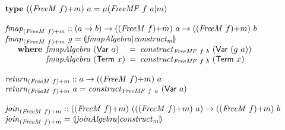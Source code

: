 \documentclass{jfp1}
\newcommand{\eFold}[2]{\llparenthesis #1|#2 \rrparenthesis}
\newcommand{\kw}[1]{\textbf{#1}}
\begin{document}
\begin{figure}
  \centering
  \begin{displaymath}
    \begin{array}{@{}l}
      \kw{type}~(\cprd{(\mathit{FreeM}~f)}{m})~a = \mu(\mathit{FreeMF}~f~a|m) \\
      \\
      \begin{array}{@{}l}
        \mathit{fmap}_{\cprd{(\mathit{FreeM}~f)}{m}} :: (a \to b) \to (\cprd{(\mathit{FreeM}~f)}{m})~a \to (\cprd{(\mathit{FreeM}~f)}{m})~b \\
        \mathit{fmap}_{\cprd{(\mathit{FreeM}~f)}{m}}~g = \eFold{\mathit{fmapAlgebra}}{\mathit{construct_m}} \\
        \quad\begin{array}{r@{\hspace{0.4em}}l@{\hspace{0.5em}}c@{\hspace{0.5em}}l}
          \kw{where} & \mathit{fmapAlgebra}~(\mathsf{Var}~a) &=& \mathit{construct}_{\mathit{FreeMF}~f~b}~(\mathsf{Var}~(g~a)) \\
          & \mathit{fmapAlgebra}~(\mathsf{Term}~x) &=& \mathit{construct}_{\mathit{FreeMF}~f~b}~(\mathsf{Term}~x)
        \end{array}
      \end{array} \\
      \\
      \begin{array}{@{}l}
        \mathit{return}_{\cprd{(\mathit{FreeM}~f)}{m}} :: a \to (\cprd{(\mathit{FreeM}~f)}{m})~a \\
        \mathit{return}_{\cprd{(\mathit{FreeM}~f)}{m}}~a = \mathit{construct}_{\mathit{FreeMF}~f~a}~(\mathsf{Var}~a)
      \end{array} \\
      \\
      \begin{array}{@{}l}
        \mathit{join}_{\cprd{(\mathit{FreeM}~f)}{m}} :: (\cprd{(\mathit{FreeM}~f)}{m})~((\cprd{(\mathit{FreeM}~f)}{m})~a) \to (\cprd{(\mathit{FreeM}~f)}{m})~b \\
        \mathit{join}_{\cprd{(\mathit{FreeM}~f)}{m}} = \eFold{\mathit{joinAlgebra}}{\mathit{construct}_m} \\
        \quad\begin{array}{r@{\hspace{0.4em}}l@{\hspace{0.5em}}c@{\hspace{0.5em}}l}

\end{array}
\end{array}
\end{array}
\end{displaymath}
\end{figure}
\end{document}
